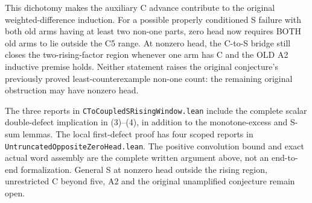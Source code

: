 This dichotomy makes the auxiliary C advance contribute to the original
weighted-difference induction. For a possible properly conditioned S
failure with both old arms having at least two non-one parts, zero head
now requires BOTH old arms to lie outside the C5 range. At nonzero head,
the C-to-S bridge still closes the two-rising-factor region whenever
one arm has C and the OLD A2 inductive premise holds. Neither statement
raises the original conjecture's previously proved least-counterexample
non-one count: the remaining original obstruction may have nonzero head.

The three reports in \texttt{CToCoupledSRisingWindow.lean} include
the complete scalar double-defect implication in (3)--(4), in addition
to the monotone-excess and S-sum lemmas. The local first-defect proof
has four scoped reports in \texttt{UntruncatedOppositeZeroHead.lean}.
The positive convolution bound and exact actual word assembly are
the complete written argument above, not an end-to-end formalization.
General S at nonzero head outside the rising region, unrestricted C
beyond five, A2 and the original unamplified conjecture remain open.
